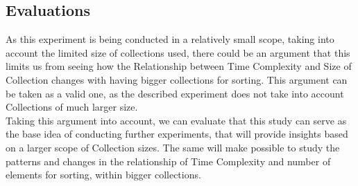 \documentclass[]{report}
\begin{document}
\subsection{Evaluations}
	As this experiment is being conducted in a relatively small scope, taking into account the limited size of collections used, there could be an argument that this limits us from seeing how the Relationship between Time Complexity and Size of Collection changes with having bigger collections for sorting. This argument can be taken as a valid one, as the described experiment does not take into account Collections of much larger size. \\
	
	Taking this argument into account, we can evaluate that this study can serve as the base idea of conducting further experiments, that will provide insights based on a larger scope of Collection sizes. The same will make possible to study the patterns and changes in the relationship of Time Complexity and number of elements for sorting, within bigger collections.
 
\end{document}
